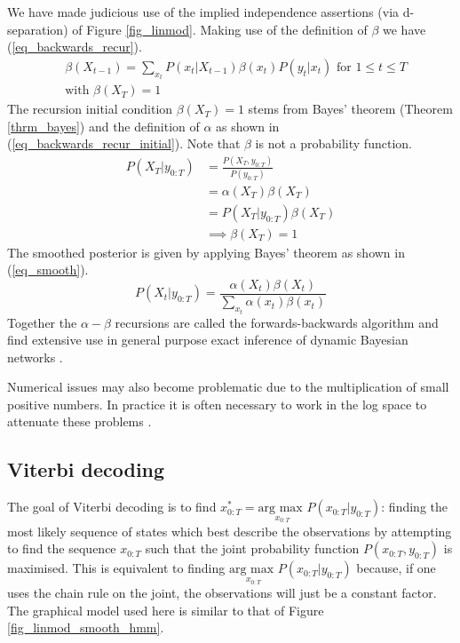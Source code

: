 We have made judicious use of the implied independence assertions (via d-separation) of Figure \ref{fig_linmod}. Making use of the definition of $\beta$ we have (\ref{eq_backwards_recur}).
\begin{equation}
\begin{aligned}
&\beta(X_{t-1}) = \sum_{x_t} P(x_t | X_{t-1})\beta(x_t)P(y_t| x_t) \text{ for } 1 \leq t \leq T \\
&\text{with } \beta(X_T) = 1
\end{aligned}
\label{eq_backwards_recur}
\end{equation}
The recursion initial condition $\beta(X_T) = 1$ stems from Bayes' theorem (Theorem \ref{thrm_bayes}) and the definition of $\alpha$ as shown in (\ref{eq_backwards_recur_initial}). Note that $\beta$ is not a probability function.
\begin{equation}
\begin{aligned}
P(X_T|y_{0:T}) &= \frac{P(X_T, y_{0:T})}{P(y_{0:T})} \\
&= \alpha(X_T) \beta(X_T)\\
&= P(X_T| y_{0:T}) \beta(X_T)\\
&\implies \beta(X_T) = 1
\end{aligned}
\label{eq_backwards_recur_initial}
\end{equation}
The smoothed posterior is given by applying Bayes' theorem as shown in (\ref{eq_smooth}).
\begin{equation}
P(X_t|y_{0:T}) = \frac{\alpha(X_t)\beta(X_t)}{\sum_{x_t}\alpha(x_t)\beta(x_t)}
\label{eq_smooth}
\end{equation}
Together the $\alpha - \beta$ recursions are called the forwards-backwards algorithm and find extensive use in general purpose exact inference of dynamic Bayesian networks \cite{murphy1}.

Numerical issues may also become problematic due to the multiplication of small positive numbers. In practice it is often necessary to work in the log space to attenuate these problems \cite{barber}. 

\subsection{Viterbi decoding}
The goal of Viterbi decoding is to find $x_{0:T}^* = \underset{x_{0:T}}{\text{arg max }} P(x_{0:T}|y_{0:T})$: finding the most likely sequence of states which best describe the observations by  attempting to find the sequence $x_{0:T}$ such that the joint probability function $P(x_{0:T}, y_{0:T})$ is maximised. This is equivalent to finding $ \underset{x_{0:T}}{\text{arg max }} P(x_{0:T}|y_{0:T})$ because, if one uses the chain rule on the joint, the observations will just be a constant factor. The graphical model used here is similar to that of Figure \ref{fig_linmod_smooth_hmm}.

